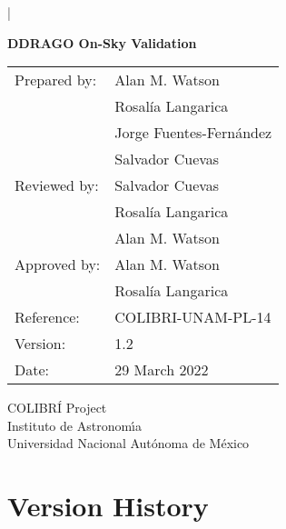 |\documentclass{article}
\begin{document}
\pagestyle{empty}

\begin{center}

{\Large \bfseries DDRAGO On-Sky Validation}

\vspace{2cm}

\begin{tabular}{ll}
Prepared by:&Alan M. Watson\\
&Rosalía Langarica\\
&Jorge Fuentes-Fernández\\
&Salvador Cuevas\\
Reviewed by:&Salvador Cuevas\\
&Rosalía Langarica\\
&Alan M. Watson\\
Approved by:&Alan M. Watson\\
&Rosalía Langarica\\
Reference:&COLIBRI-UNAM-PL-14\\
Version:&1.2\\
Date:&29 March 2022\\
\end{tabular}

\vspace{\fill}

COLIBRÍ Project\\
Instituto de Astronom{\'\i}a\\
Universidad Nacional Aut\'onoma de M\'exico

\end{center}

\newpage


\pagestyle{plain}

\setcounter{tocdepth}{2}
\tableofcontents
\newpage




\clearpage
\section*{Version History}
\end{document}
